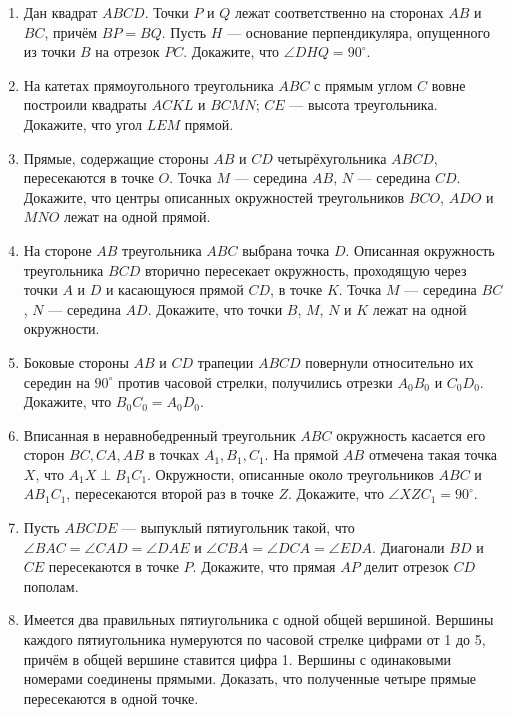 \documentclass{article}
\begin{document}
\begin{enumerate}[label*=\protect\fbox{\arabic{enumi}}]

\item Дан квадрат $ABCD$. Точки $P$ и $Q$ лежат соответственно на сторонах $AB$ и $BC$, причём $BP =BQ$. Пусть $H$ — основание перпендикуляра, опущенного из точки $B$ на отрезок $PC$. Докажите, что $\angle DHQ = 90^\circ$.

\item На катетах прямоугольного треугольника $ABC$ с прямым углом $C$ вовне построили квадраты $ACKL$ и $BCMN$; $CE$ — высота треугольника. Докажите, что угол $LEM$ прямой.

\item Прямые, содержащие стороны $AB$ и $CD$ четырёхугольника $ABCD$, пересекаются в точке $O$. Точка $M$ — середина $AB$, $N$ — середина $CD$. Докажите, что центры описанных окружностей треугольников $BCO$, $ADO$ и $MNO$ лежат на одной прямой.

\item На стороне $AB$ треугольника $ABC$ выбрана точка $D$. Описанная окружность треугольника $BCD$ вторично пересекает окружность, проходящую через точки $A$ и $D$ и касающуюся прямой $CD$, в точке $K$. Точка $M$ — середина $BC$, $N$ — середина $AD$. Докажите, что точки $B$, $M$, $N$ и $K$ лежат на одной окружности.

\item Боковые стороны $AB$ и $CD$ трапеции $ABCD$ повернули относительно их середин на $90^\circ$ против часовой стрелки, получились отрезки $A_0B_0$ и $C_0D_0$. Докажите, что $B_0C_0=A_0D_0$.

\item Вписанная в неравнобедренный треугольник $ABC$ окружность касается его сторон $BC, CA, AB$ в точках $A_1, B_1, C_1$. На прямой $AB$ отмечена такая точка $X$, что $A_1X\perp B_1C_1$. Окружности, описанные около треугольников $ABC$ и $AB_1C_1$, пересекаются второй раз в точке $Z$. Докажите, что $\angle XZC_1=90^\circ$.

\item  Пусть $ABCDE$ — выпуклый пятиугольник такой, что
$\angle BAC=\angle CAD=\angle DAE$ и $\angle CBA=\angle DCA=\angle EDA$.
Диагонали $BD$ и $CE$ пересекаются в точке $P$. Докажите, что прямая $AP$ делит отрезок $CD$ пополам.

\item Имеется два правильных пятиугольника с одной общей вершиной. Вершины каждого пятиугольника нумеруются по часовой стрелке цифрами от 1 до 5, причём в общей вершине ставится цифра 1. Вершины с одинаковыми номерами соединены прямыми. Доказать, что полученные четыре прямые пересекаются в одной точке.


\end{enumerate}
\end{document}
